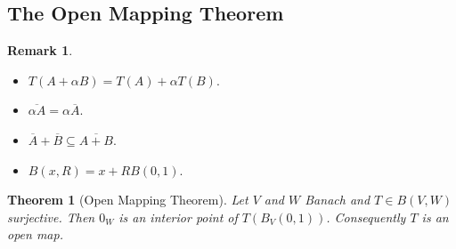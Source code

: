\documentclass[11pt,a4paper]{article}
\theoremstyle{definition}
\newtheorem{remark}[definition]{Remark}
\theoremstyle{plain}
\newtheorem{theorem}[definition]{Theorem}
\theoremstyle{remark}
\newcommand{\1}{\mathbbm{1}}
\begin{document}
\subsection{The Open Mapping Theorem}

\begin{remark}
    \begin{itemize}
        \item $T(A+ \alpha B) = T(A) + \alpha T(B)$. 
        \item $\overline{\alpha A} = \alpha \overline{A}$.
        \item $\overline{A} + \overline{B} \subseteq \overline{A+B}$. 
        \item $B(x, R) = x + RB(0,1)$.
    \end{itemize}
\end{remark}

\begin{theorem}[Open Mapping Theorem]
    Let $V$ and $W$ Banach and $T \in B(V, W)$ surjective. Then $0_W$ is an interior point of $T(B_V(0,1))$. Consequently $T$ is an open map. 
\end{theorem}
\end{document}
